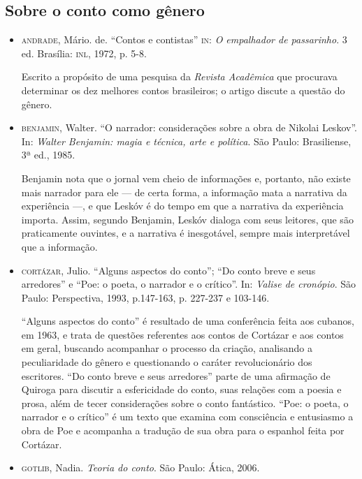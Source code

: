 \documentclass[11pt]{extarticle}
\begin{document}
\subsection{Sobre o conto como gênero}

\begin{itemize}
\item\textsc{andrade}, Mário. de. ``Contos e contistas'' \textsc{in}: \emph{O empalhador de
passarinho}. 3 ed. Brasília: \textsc{inl}, 1972, p. 5-8.

Escrito a propósito
de uma pesquisa da \emph{Revista Acadêmica} que procurava determinar os
dez melhores contos brasileiros; o artigo discute a questão do gênero.

\item\textsc{benjamin}, Walter. ``O narrador: considerações sobre a obra de Nikolai
Leskov''. In: \emph{Walter Benjamin: magia e técnica, arte e política}.
São Paulo: Brasiliense, 3ª ed., 1985.

Benjamin nota que o jornal vem
cheio de informações e, portanto, não existe mais narrador para ele ---
de certa forma, a informação mata a narrativa da experiência ---, e que
Leskóv é do tempo em que a narrativa da experiência importa. Assim,
segundo Benjamin, Leskóv dialoga com seus leitores, que são praticamente
ouvintes, e a narrativa é inesgotável, sempre mais interpretável que a
informação.

\item\textsc{cortázar}, Julio. ``Alguns aspectos do conto''; ``Do conto breve e seus arredores'' e ``Poe: o poeta, o narrador e o crítico''. In: \emph{Valise
de cronópio}. São Paulo: Perspectiva, 1993, p.147-163, p. 227-237 e
103-146. 

``Alguns aspectos do conto'' é resultado de uma conferência
feita aos cubanos, em 1963, e trata de questões referentes aos contos de
Cortázar e aos contos em geral, buscando acompanhar o processo da
criação, analisando a peculiaridade do gênero e questionando o caráter
revolucionário dos escritores. ``Do conto breve e seus arredores'' parte
de uma afirmação de Quiroga para discutir a esfericidade do conto, suas
relações com a poesia e prosa, além de tecer considerações sobre o conto
fantástico. ``Poe: o poeta, o narrador e o crítico'' é um texto que
examina com consciência e entusiasmo a obra de Poe e acompanha a
tradução de sua obra para o espanhol feita por Cortázar.

\item\textsc{gotlib}, Nadia. \emph{Teoria do conto}. São Paulo: Ática, 2006.


\end{itemize}
\end{document}
